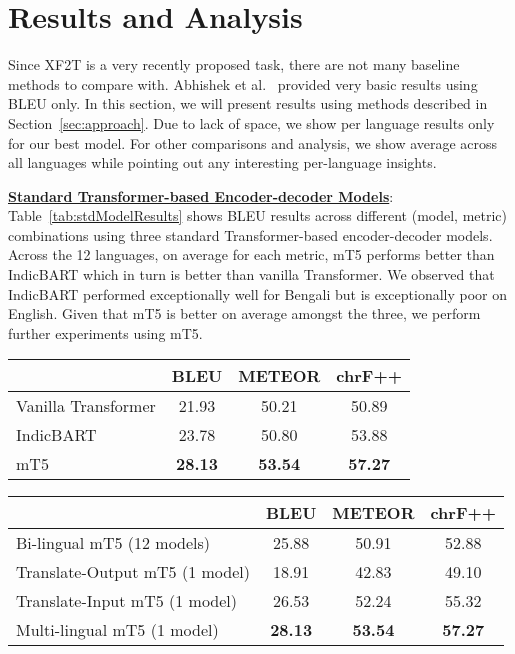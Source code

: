 \documentclass[runningheads]{llncs}
\newcommand{\data}{\textsc{XAlignV2}}
\begin{document}
\section{Results and Analysis}
\label{sec:results}

Since XF2T is a very recently proposed task, there are not many baseline methods to compare with. Abhishek et al.~\cite{abhishek2022xalign} provided very basic results using BLEU only. In this section, we will present results using methods described in Section~\ref{sec:approach}. Due to lack of space, we show per language results only for our best model. For other comparisons and analysis, we show average across all languages while pointing out any interesting per-language insights.

\noindent\underline{\textbf{Standard Transformer-based Encoder-decoder Models}}: Table~\ref{tab:stdModelResults} shows BLEU results across different (model, metric) combinations using three standard Transformer-based encoder-decoder models. Across the 12 languages, on average for each metric, mT5 performs better than IndicBART which in turn is better than vanilla Transformer. We observed that IndicBART performed exceptionally well for Bengali but is exceptionally poor on English. Given that mT5 is better on average amongst the three, we perform further experiments using mT5. 
\begin{table*}
\begin{minipage}{0.44\textwidth}
     \centering
    \scriptsize
    \begin{tabular}{|l||c|c|c|}
\hline
&BLEU&METEOR&chrF++\\
\hline
\hline
Vanilla Transformer&21.93&50.21&50.89\\
\hline
IndicBART&23.78&50.80&53.88\\
\hline
mT5&\textbf{28.13}&\textbf{53.54}&\textbf{57.27}\\
\hline
    \end{tabular}
    \caption{XF2T scores on \data{} test set using standard Transformer-based encoder-decoder models. Best results are highlighted.}
    \label{tab:stdModelResults}
\end{minipage}
\hspace{0.04\textwidth}
\begin{minipage}{0.48\textwidth}
    \centering
    \scriptsize
    \begin{tabular}{|l||c|c|c|}
\hline
&BLEU&METEOR&chrF++\\
\hline
\hline
Bi-lingual mT5 (12 models)&25.88&50.91&52.88\\
\hline
Translate-Output mT5 (1 model)&18.91&42.83&49.10\\
\hline
Translate-Input mT5 (1 model)&26.53&52.24&55.32\\
\hline
Multi-lingual mT5 (1 model)&\textbf{28.13}&\textbf{53.54}&\textbf{57.27}\\
\hline
    \end{tabular}
    \caption{XF2T scores on \data{} test set using bi-lingual, multi-lingual and translation-based variants of mT5 model. Best results are highlighted.}
    \label{tab:bi-lingualMulti-lingualTranslation}
\end{minipage}
\end{table*}
\end{document}
